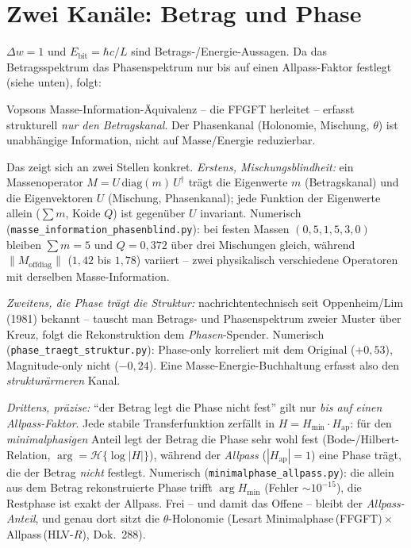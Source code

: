 \section{Zwei Kanäle: Betrag und Phase}
$\Delta w=1$ und $E_\text{bit}=\hbar c/L$ sind Betrags-/Energie-Aussagen. Da das Betragsspektrum das
Phasenspektrum nur bis auf einen Allpass-Faktor festlegt (siehe unten), folgt:

Vopsons Masse-Information-Äquivalenz -- die FFGFT herleitet -- erfasst strukturell \emph{nur den
Betragskanal}. Der Phasenkanal (Holonomie, Mischung, $\theta$) ist unabhängige Information, nicht auf
Masse/Energie reduzierbar.

Das zeigt sich an zwei Stellen konkret. \emph{Erstens, Mischungsblindheit:} ein Massenoperator
$M=U\,\mathrm{diag}(m)\,U^{\dagger}$ trägt die Eigenwerte $m$ (Betragskanal) und die Eigenvektoren $U$
(Mischung, Phasenkanal); jede Funktion der Eigenwerte allein ($\sum m$, Koide $Q$) ist gegenüber $U$
invariant. Numerisch (\texttt{masse\_information\_phasenblind.py}): bei festen Massen $(0{,}5,1{,}5,3{,}0)$
bleiben $\sum m=5$ und $Q=0{,}372$ über drei Mischungen gleich, während $\lVert M_\text{offdiag}\rVert$
($1{,}42$ bis $1{,}78$) variiert -- zwei physikalisch verschiedene Operatoren mit derselben
Masse-Information.

\emph{Zweitens, die Phase trägt die Struktur:} nachrichtentechnisch seit Oppenheim/Lim (1981) bekannt --
tauscht man Betrags- und Phasenspektrum zweier Muster über Kreuz, folgt die Rekonstruktion dem
\emph{Phasen}-Spender. Numerisch (\texttt{phase\_traegt\_struktur.py}): Phase-only korreliert mit dem
Original ($+0{,}53$), Magnitude-only nicht ($-0{,}24$). Eine Masse-Energie-Buchhaltung erfasst also den
\emph{strukturärmeren} Kanal.

\emph{Drittens, präzise:} \enquote{der Betrag legt die Phase nicht fest} gilt nur \emph{bis auf einen
Allpass-Faktor}. Jede stabile Transferfunktion zerfällt in $H=H_\text{min}\cdot H_\text{ap}$: für den
\emph{minimalphasigen} Anteil legt der Betrag die Phase sehr wohl fest (Bode-/Hilbert-Relation,
$\arg=\mathcal{H}\{\log|H|\}$), während der \emph{Allpass} ($|H_\text{ap}|=1$) eine Phase trägt, die der
Betrag \emph{nicht} festlegt. Numerisch (\texttt{minimalphase\_allpass.py}): die allein aus dem Betrag
rekonstruierte Phase trifft $\arg H_\text{min}$ (Fehler $\sim10^{-15}$), die Restphase ist exakt der
Allpass. Frei -- und damit das Offene -- bleibt der \emph{Allpass-Anteil}, und genau dort sitzt die
$\theta$-Holonomie (Lesart Minimalphase\,(FFGFT)\,$\times$\,Allpass\,(HLV-$R$), Dok.~288).

